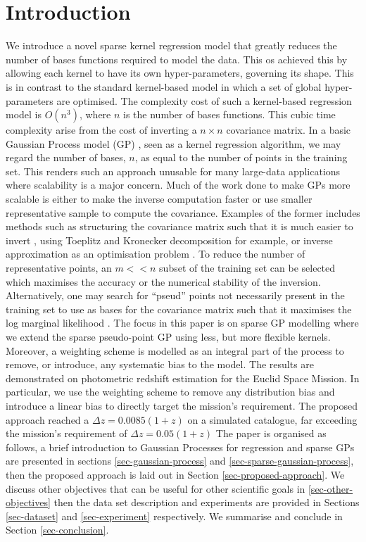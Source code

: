 \documentclass[a4paper,12pt]{article}
\begin{document}
\section{Introduction}
We introduce a novel sparse kernel regression model that greatly reduces the number of bases functions required to model the data. This os achieved this by allowing each kernel to have its own hyper-parameters, governing its shape. This is in contrast to the standard kernel-based model in which a set of global hyper-parameters are optimised. The complexity cost of such a kernel-based regression model is $O(n^{3})$, where $n$ is the number of bases functions. This cubic time complexity arise from the cost of inverting a $n \times n$ covariance matrix. In a basic Gaussian Process model (GP) \cite{rasmussen+williams}, seen as a kernel regression algorithm, we may regard the number of bases, $n$, as equal to the number of points in the training set. This renders such an approach unusable for many large-data applications where scalability is a major concern. Much of the work done to make GPs more scalable \cite{sparseGPcitations} is either to make the inverse computation faster or use smaller representative sample to compute the covariance. Examples of the former includes methods such as structuring the covariance matrix such that it is much easier to invert \cite{}, using Toeplitz and Kronecker decomposition for example, or inverse approximation as an optimisation problem \cite{}. To reduce the number of representative points, an $m << n$ subset of the training set can be selected which maximises the accuracy or the numerical stability of the inversion. Alternatively, one may search for ``pseud'' points not necessarily present in the training set to use as bases for the covariance matrix such that it maximises the log marginal likelihood \cite{}. The focus in this paper is on sparse GP modelling where we extend the sparse pseudo-point GP using less, but more flexible kernels. Moreover, a weighting scheme is modelled as an integral part of the process to remove, or introduce, any systematic bias to the model. The results are demonstrated on photometric redshift estimation for the Euclid Space Mission. In particular, we use the weighting scheme to remove any distribution bias and introduce a linear bias to directly target the mission's requirement. The proposed approach reached a $\Delta z = 0.0085(1+z)$ on a simulated catalogue, far exceeding the mission's requirement of $\Delta z = 0.05(1+z)$ The paper is organised as follows, a brief introduction to Gaussian Processes for regression and sparse GPs are presented in sections \ref{sec-gaussian-process} and \ref{sec-sparse-gaussian-process},  then the proposed approach is laid out in Section \ref{sec-proposed-approach}. We discuss other objectives that can be useful for other scientific goals in \ref{sec-other-objectives} then the data set description and experiments are provided in Sections \ref{sec-dataset} and \ref{sec-experiment} respectively. We summarise and conclude in Section \ref{sec-conclusion}.
\end{document}
